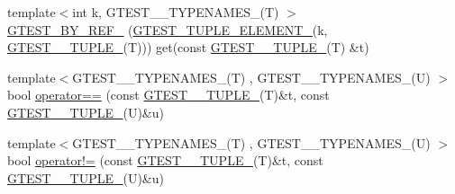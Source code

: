 \begin{DoxyCompactItemize}
\item 
{\footnotesize template$<$int k, G\+T\+E\+S\+T\+\_\+\_\+\+T\+Y\+P\+E\+N\+A\+M\+E\+S\+\_\+(\+T) $>$ }\\\mbox{\hyperlink{namespacestd_1_1tr1_ae7b5ea477ac34a3eef5c4c15c42b76ed}{G\+T\+E\+S\+T\+\_\+\+B\+Y\+\_\+\+R\+E\+F\+\_\+}} (\mbox{\hyperlink{gtest-tuple_8h_a1b7f133d8aa02e0b7afed7b66781eeb7}{G\+T\+E\+S\+T\+\_\+\+T\+U\+P\+L\+E\+\_\+\+E\+L\+E\+M\+E\+N\+T\+\_\+}}(k, \mbox{\hyperlink{namespacestd_1_1tr1_aa636d3269bf1f368a7bc09ff158bc482}{G\+T\+E\+S\+T\+\_\+\_\+\+T\+U\+P\+L\+E\+\_\+}}(T))) get(const \mbox{\hyperlink{namespacestd_1_1tr1_aa636d3269bf1f368a7bc09ff158bc482}{G\+T\+E\+S\+T\+\_\+\_\+\+T\+U\+P\+L\+E\+\_\+}}(T) \&t)
\item 
{\footnotesize template$<$G\+T\+E\+S\+T\+\_\+\_\+\+T\+Y\+P\+E\+N\+A\+M\+E\+S\+\_\+(\+T) , G\+T\+E\+S\+T\+\_\+\_\+\+T\+Y\+P\+E\+N\+A\+M\+E\+S\+\_\+(\+U) $>$ }\\bool \mbox{\hyperlink{namespacestd_1_1tr1_af4516de784404381f9b14797694b6311}{operator==}} (const \mbox{\hyperlink{namespacestd_1_1tr1_aa636d3269bf1f368a7bc09ff158bc482}{G\+T\+E\+S\+T\+\_\+\_\+\+T\+U\+P\+L\+E\+\_\+}}(T)\&t, const \mbox{\hyperlink{namespacestd_1_1tr1_aa636d3269bf1f368a7bc09ff158bc482}{G\+T\+E\+S\+T\+\_\+\_\+\+T\+U\+P\+L\+E\+\_\+}}(U)\&u)
\item 
{\footnotesize template$<$G\+T\+E\+S\+T\+\_\+\_\+\+T\+Y\+P\+E\+N\+A\+M\+E\+S\+\_\+(\+T) , G\+T\+E\+S\+T\+\_\+\_\+\+T\+Y\+P\+E\+N\+A\+M\+E\+S\+\_\+(\+U) $>$ }\\bool \mbox{\hyperlink{namespacestd_1_1tr1_a058882c51de469b5e78d29076f864940}{operator!=}} (const \mbox{\hyperlink{namespacestd_1_1tr1_aa636d3269bf1f368a7bc09ff158bc482}{G\+T\+E\+S\+T\+\_\+\_\+\+T\+U\+P\+L\+E\+\_\+}}(T)\&t, const \mbox{\hyperlink{namespacestd_1_1tr1_aa636d3269bf1f368a7bc09ff158bc482}{G\+T\+E\+S\+T\+\_\+\_\+\+T\+U\+P\+L\+E\+\_\+}}(U)\&u)
\end{DoxyCompactItemize}

